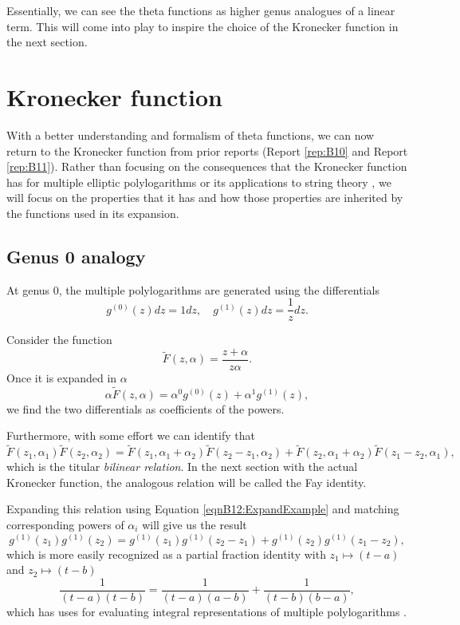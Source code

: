 Essentially, we can see the theta functions as higher genus analogues of a linear term. This will come into play to inspire the choice of the Kronecker function in the next section.

\section{Kronecker function}\label{secB12:Kronecker}

With a better understanding and formalism of theta functions, we can now return to the Kronecker function from prior reports (Report \ref{rep:B10} and Report \ref{rep:B11}). Rather than focusing on the consequences that the Kronecker function has for multiple elliptic polylogarithms \cite{BL13} or its applications to string theory \cite{Broedel_2022}, we will focus on the properties that it has and how those properties are inherited by the functions used in its expansion.

\subsection{Genus 0 analogy}

At genus 0, the multiple polylogarithms are generated using the differentials
\begin{equation}
    g^{(0)}(z)dz = 1 dz , \quad g^{(1)}(z)dz = \frac{1}{z} dz.
\end{equation}

Consider the function
\begin{equation}
    \tilde F(z,\alpha) = \frac{z+\alpha}{z\alpha}.
\end{equation}
Once it is expanded in $\alpha$
\begin{equation}\label{eqnB12:ExpandExample}
    \alpha \tilde{F}(z,\alpha) = \alpha^0 g^{(0)}(z) + \alpha^1 g^{(1)}(z),
\end{equation}
we find the two differentials as coefficients of the powers.

Furthermore, with some effort we can identify that
\begin{equation}
    \tilde{F}(z_1,\alpha_1)\tilde{F}(z_2,\alpha_2) = \tilde{F}(z_1,\alpha_1+\alpha_2)\tilde{F}(z_2-z_1,\alpha_2) + \tilde{F}(z_2,\alpha_1+\alpha_2)\tilde{F}(z_1-z_2,\alpha_1),
\end{equation}
which is the titular \emph{bilinear relation}. In the next section with the actual Kronecker function, the analogous relation will be called the Fay identity.

Expanding this relation using Equation \ref{eqnB12:ExpandExample} and matching corresponding powers of $\alpha_i$ will give us the result
\begin{equation}
    g^{(1)}(z_1)g^{(1)}(z_2) = g^{(1)}(z_1)g^{(1)}(z_2-z_1) + g^{(1)}(z_2)g^{(1)}(z_1-z_2),
\end{equation}
which is more easily recognized as a partial fraction identity with $z_1 \mapsto (t-a)$ and $z_2 \mapsto (t-b)$
\begin{equation}
    \frac{1}{(t-a)(t-b)} = \frac{1}{(t-a)(a-b)} + \frac{1}{(t-b)(b-a)},
\end{equation}
which has uses for evaluating integral representations of multiple polylogarithms \cite{Broedel_2015}.


